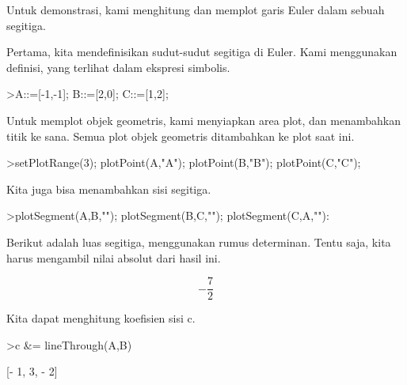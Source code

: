 \documentclass[a4paper,10pt]{article}
\begin{document}
\begin{eulernotebook}
\begin{eulercomment}
\begin{eulercomment}
\begin{eulercomment}
Untuk demonstrasi, kami menghitung dan memplot garis Euler dalam
sebuah segitiga.

Pertama, kita mendefinisikan sudut-sudut segitiga di Euler. Kami
menggunakan definisi, yang terlihat dalam ekspresi simbolis.
\end{eulercomment}
\begin{eulerprompt}
>A::=[-1,-1]; B::=[2,0]; C::=[1,2];
\end{eulerprompt}
\begin{eulercomment}
Untuk memplot objek geometris, kami menyiapkan area plot, dan
menambahkan titik ke sana. Semua plot objek geometris ditambahkan ke
plot saat ini.
\end{eulercomment}
\begin{eulerprompt}
>setPlotRange(3); plotPoint(A,"A"); plotPoint(B,"B"); plotPoint(C,"C");
\end{eulerprompt}
\begin{eulercomment}
Kita juga bisa menambahkan sisi segitiga.
\end{eulercomment}
\begin{eulerprompt}
>plotSegment(A,B,""); plotSegment(B,C,""); plotSegment(C,A,""):
\end{eulerprompt}
\begin{eulercomment}
Berikut adalah luas segitiga, menggunakan rumus determinan. Tentu
saja, kita harus mengambil nilai absolut dari hasil ini.
\end{eulercomment}
\begin{eulerformula}
\[
-\frac{7}{2}
\]
\end{eulerformula}
\begin{eulercomment}
Kita dapat menghitung koefisien sisi c.
\end{eulercomment}
\begin{eulerprompt}
>c &= lineThrough(A,B)
\end{eulerprompt}
\begin{euleroutput}
  
                              [- 1, 3, - 2]
  

\end{euleroutput}
\end{eulercomment}
\end{eulercomment}
\end{eulernotebook}
\end{document}
